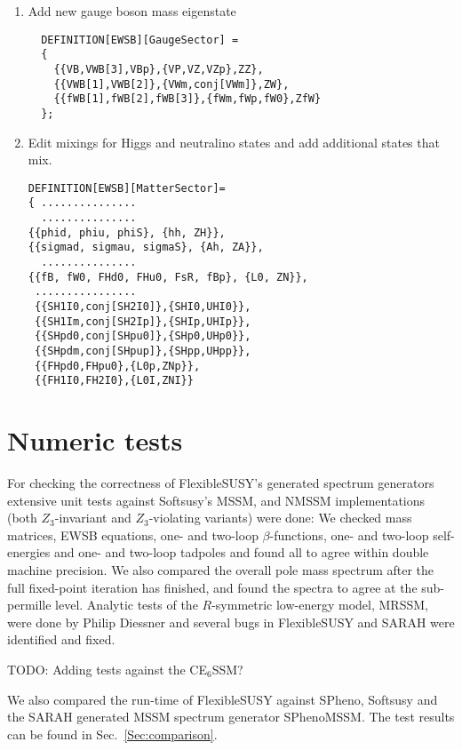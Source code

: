 \documentclass[final,3p,11pt,pdflatex]{elsarticle}
\newcommand{\fs}{FlexibleSUSY\xspace}
\newcommand{\secref}[1]{Sec.~\ref{#1}}
\begin{document}
\begin{enumerate}
\begin{enumerate}
\item Add new gauge boson  mass eigenstate
\begin{lstlisting} 
  DEFINITION[EWSB][GaugeSector] =
  { 
    {{VB,VWB[3],VBp},{VP,VZ,VZp},ZZ},
    {{VWB[1],VWB[2]},{VWm,conj[VWm]},ZW},
    {{fWB[1],fWB[2],fWB[3]},{fWm,fWp,fW0},ZfW}
  }; 
\end{lstlisting}
\item Edit mixings for Higgs and neutralino states and add additional states that mix.
\begin{lstlisting}
DEFINITION[EWSB][MatterSector]= 
{ ...............
  ...............
{{phid, phiu, phiS}, {hh, ZH}},
{{sigmad, sigmau, sigmaS}, {Ah, ZA}},
  ...............
{{fB, fW0, FHd0, FHu0, FsR, fBp}, {L0, ZN}},
 ................ 
 {{SH1I0,conj[SH2I0]},{SHI0,UHI0}},
 {{SH1Im,conj[SH2Ip]},{SHIp,UHIp}},
 {{SHpd0,conj[SHpu0]},{SHp0,UHp0}},
 {{SHpdm,conj[SHpup]},{SHpp,UHpp}},
 {{FHpd0,FHpu0},{L0p,ZNp}},
 {{FH1I0,FH2I0},{L0I,ZNI}}
\end{lstlisting}
\end{enumerate}  
 
\end{enumerate}   

\section{Numeric tests}

For checking the correctness of \fs's generated spectrum generators
extensive unit tests against Softsusy's MSSM, and NMSSM
implementations (both $Z_3$-invariant and $Z_3$-violating variants)
were done: We checked mass matrices, EWSB equations, one- and two-loop
$\beta$-functions, one- and two-loop self-energies and one- and
two-loop tadpoles and found all to agree within double machine
precision.  We also compared the overall pole mass spectrum after the
full fixed-point iteration has finished, and found the spectra to
agree at the sub-permille level.  Analytic tests of the $R$-symmetric
low-energy model, MRSSM, were done by Philip Diessner and several bugs
in \fs and SARAH were identified and fixed.

TODO: Adding tests against the CE$_6$SSM?

We also compared the run-time of \fs against SPheno, Softsusy and the
SARAH generated MSSM spectrum generator SPhenoMSSM.  The test results
can be found in \secref{Sec:comparison}.
\end{document}
